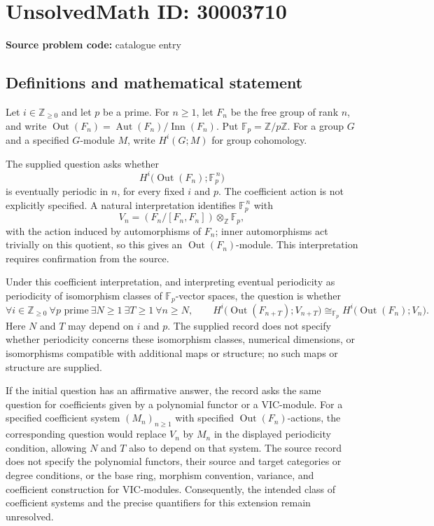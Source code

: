 \documentclass[11pt]{article}
\newcommand{\Z}{\mathbb{Z}}
\newcommand{\F}{\mathbb{F}}
\begin{document}
\section*{UnsolvedMath ID: 30003710}
\textbf{Source problem code:} catalogue entry
\subsection{Definitions and mathematical statement}
Let \(i\in\Z_{\geq 0}\) and let \(p\) be a prime. For \(n\geq 1\), let \(F_n\) be the free group of rank \(n\), and write \(\operatorname{Out}(F_n)=\operatorname{Aut}(F_n)/\operatorname{Inn}(F_n)\). Put \(\F_p=\Z/p\Z\). For a group \(G\) and a specified \(G\)-module \(M\), write \(H^i(G;M)\) for group cohomology.

The supplied question asks whether
\[
H^i\bigl(\operatorname{Out}(F_n);\F_p^{\,n}\bigr)
\]
is eventually periodic in \(n\), for every fixed \(i\) and \(p\). The coefficient action is not explicitly specified. A natural interpretation identifies \(\F_p^{\,n}\) with
\[
V_n=(F_n/[F_n,F_n])\otimes_{\Z}\F_p,
\]
with the action induced by automorphisms of \(F_n\); inner automorphisms act trivially on this quotient, so this gives an \(\operatorname{Out}(F_n)\)-module. This interpretation requires confirmation from the source.

Under this coefficient interpretation, and interpreting eventual periodicity as periodicity of isomorphism classes of \(\F_p\)-vector spaces, the question is whether
\[
\forall i\in\Z_{\geq0}\ \forall p\text{ prime}\ \exists N\geq1\ \exists T\geq1\ \forall n\geq N,\qquad
H^i\bigl(\operatorname{Out}(F_{n+T});V_{n+T}\bigr)
\cong_{\F_p}
H^i\bigl(\operatorname{Out}(F_n);V_n\bigr).
\]
Here \(N\) and \(T\) may depend on \(i\) and \(p\). The supplied record does not specify whether periodicity concerns these isomorphism classes, numerical dimensions, or isomorphisms compatible with additional maps or structure; no such maps or structure are supplied.

If the initial question has an affirmative answer, the record asks the same question for coefficients given by a polynomial functor or a VIC-module. For a specified coefficient system \((M_n)_{n\geq1}\) with specified \(\operatorname{Out}(F_n)\)-actions, the corresponding question would replace \(V_n\) by \(M_n\) in the displayed periodicity condition, allowing \(N\) and \(T\) also to depend on that system. The source record does not specify the polynomial functors, their source and target categories or degree conditions, or the base ring, morphism convention, variance, and coefficient construction for VIC-modules. Consequently, the intended class of coefficient systems and the precise quantifiers for this extension remain unresolved.
\end{document}
